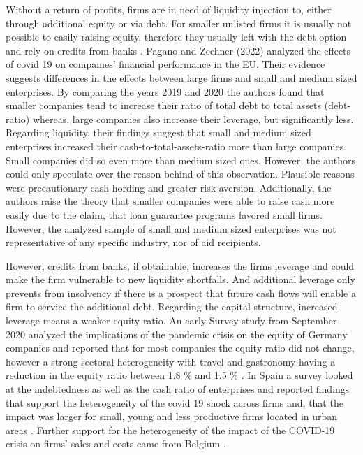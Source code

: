 Without a return of profits, firms are in need of liquidity injection to, either through additional equity or via debt. For smaller unlisted firms it is usually not possible to easily raising equity, therefore they usually left with the debt option and rely on credits from banks \parencite{pagano_covid-19_2022}. Pagano and Zechner (2022) analyzed the effects of covid 19 on companies’ financial performance in the EU. Their evidence suggests differences in the effects between large firms and small and medium sized enterprises. By comparing the years 2019 and 2020 the authors found that smaller companies tend to increase their ratio of total debt to total assets (debt-ratio) whereas, large companies also increase their leverage, but significantly less. Regarding liquidity, their findings suggest that small and medium sized enterprises increased their cash-to-total-assets-ratio more than large companies. Small companies did so even more than medium sized ones. However, the authors could only speculate over the reason behind of this observation. Plausible reasons were precautionary cash hording and greater risk aversion. Additionally, the authors raise the theory that smaller companies were able to raise cash more easily due to the claim, that loan guarantee programs favored small firms. However, the analyzed sample of small and medium sized enterprises was not representative of any specific industry, nor of aid recipients.

However, credits from banks, if obtainable, increases the firms leverage and could make the firm vulnerable to new liquidity shortfalls. And additional leverage only prevents from insolvency if there is a prospect that future cash flows will enable a firm to service the additional debt. Regarding the capital structure, increased leverage means a weaker equity ratio. An early Survey study from September 2020 analyzed the implications of the pandemic crisis on the equity of Germany companies and reported that for most companies the equity ratio did not change, however a strong sectoral heterogeneity with travel and gastronomy having a reduction in the equity ratio between 1.8 \% and 1.5 \% \parencite{peichl_eigenkapitalentwicklung_2021}. In Spain a survey looked at the indebtedness as well as the cash ratio of enterprises and reported findings that support the heterogeneity of the covid 19 shock across firms and, that the impact was larger for small, young and less productive firms located in urban areas \parencite{fernandez-cerezo_firm-level_2021}. Further support for the heterogeneity of the impact of the COVID-19 crisis on firms’ sales and costs came from Belgium \parencite{dhyne_belgian_2021}.

